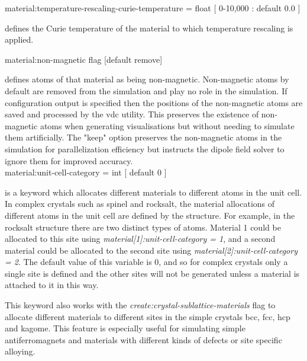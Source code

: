 {\zicf material:temperature-rescaling-curie-temperature = float [ 0-10,000 : default 0.0 ]} defines the Curie temperature of the material to which temperature rescaling is applied.

{\zicf material:non-magnetic flag [default remove]}
 defines atoms of
that material as being non-magnetic. Non-magnetic atoms by default are removed
from the simulation and play no role in the simulation. If configuration
output is specified then the positions of the non-magnetic atoms are saved and
processed by the vdc utility. This preserves the existence of non-magnetic
atoms when generating visualisations but without needing to simulate them
artificially. The "keep" option preserves the non-magnetic atoms in the
simulation for parallelization efficiency but instructs the dipole field solver
to ignore them for improved accuracy.\\


{\zicf material:unit-cell-category = int [ default 0 ]}
 is a keyword
which allocates different materials to different atoms in the unit cell. In
complex crystals such as spinel and rocksalt, the material allocations of
different atoms in the unit cell are defined by the structure. For example, in
the rocksalt structure there are two distinct types of atoms. Material 1
could be allocated to this site using \textit{material[1]:unit-cell-category = 1},
and a second material could be allocated to the second site using
\textit{material[2]:unit-cell-category = 2}. The default value of this variable
is 0, and so for complex crystals only a single site is defined and the other
sites will not be generated unless a material is attached to it in this way.

This keyword also works with the \textit{create:crystal-sublattice-materials}
flag to allocate different materials to different sites in the simple crystals
bcc, fcc, hcp and kagome. This feature is especially useful for simulating
simple antiferromagnets and materials with different kinds of defects or site
specific alloying.

